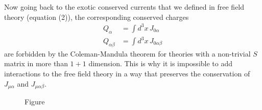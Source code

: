 Now going back to the exotic conserved currents that we defined
in free field theory (equation (2)), the corresponding conserved
charges
\begin{equation}
\begin{aligned}
Q_\alpha &= \int d^3x\, J_{0\alpha} \\
Q_{\alpha\beta} &= \int d^3x\, J_{0\alpha\beta}
\end{aligned}
\tag{3}
\end{equation}
are forbidden by the Coleman-Mandula theorem for theories with a
non-trivial $S$ matrix in more than $1+1$ dimension. This is why it is
impossible to add interactions to
the free field theory in a way that
preserves the conservation of $J_{\mu\alpha}$
and $J_{\mu\alpha\beta}$.

\begin{figure}
\vspace{-1.3\baselineskip}
\centering
{}
\par\smallskip
Figure~\thefigure
\vspace{-0.9\baselineskip}
\end{figure}

\begingroup
\renewcommand{\thefootnote}{\fnsymbol{footnote}}
\endgroup

